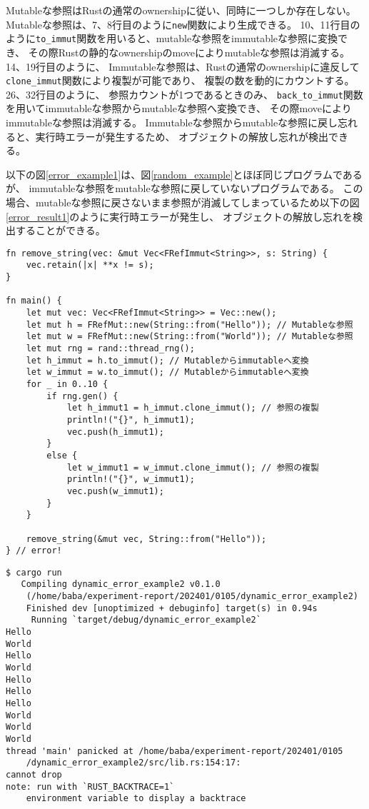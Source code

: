 \documentclass{sumiilab-paper}
\theoremstyle{mystyle}
\numberwithin{definition}{chapter} %
\begin{document}
Mutableな参照はRustの通常のownershipに従い、同時に一つしか存在しない。
Mutableな参照は、7、8行目のように\texttt{new}関数により生成できる。
10、11行目のように\texttt{to\_immut}関数を用いると、mutableな参照をimmutableな参照に変換でき、
その際Rustの静的なownershipのmoveによりmutableな参照は消滅する。
14、19行目のように、
Immutableな参照は、Rustの通常のownershipに違反して\texttt{clone\_immut}関数により複製が可能であり、
複製の数を動的にカウントする。
26、32行目のように、
参照カウントが1つであるときのみ、
\texttt{back\_to\_immut}関数を用いてimmutableな参照からmutableな参照へ変換でき、
その際moveによりimmutableな参照は消滅する。
Immutableな参照からmutableな参照に戻し忘れると、実行時エラーが発生するため、
オブジェクトの解放し忘れが検出できる。

以下の図\ref{error_example1}は、図\ref{random_example}とほぼ同じプログラムであるが、
immutableな参照をmutableな参照に戻していないプログラムである。
この場合、mutableな参照に戻さないまま参照が消滅してしまっているため以下の図\ref{error_result1}のように実行時エラーが発生し、
オブジェクトの解放し忘れを検出することができる。
\begin{lstlisting}[caption=オブジェクトの解放し忘れを検出する例, 
  label=error_example1, captionpos=b]
fn remove_string(vec: &mut Vec<FRefImmut<String>>, s: String) {
    vec.retain(|x| **x != s);
}

fn main() {
    let mut vec: Vec<FRefImmut<String>> = Vec::new();
    let mut h = FRefMut::new(String::from("Hello")); // Mutableな参照
    let mut w = FRefMut::new(String::from("World")); // Mutableな参照
    let mut rng = rand::thread_rng();
    let h_immut = h.to_immut(); // Mutableからimmutableへ変換
    let w_immut = w.to_immut(); // Mutableからimmutableへ変換
    for _ in 0..10 {
        if rng.gen() {
            let h_immut1 = h_immut.clone_immut(); // 参照の複製
            println!("{}", h_immut1);
            vec.push(h_immut1);
        }
        else {
            let w_immut1 = w_immut.clone_immut(); // 参照の複製
            println!("{}", w_immut1);
            vec.push(w_immut1);
        }
    }

    remove_string(&mut vec, String::from("Hello"));
} // error!
\end{lstlisting}
\begin{lstlisting}[caption=オブジェクトの解放し忘れのエラー, 
  label=error_result1, captionpos=b]
$ cargo run
   Compiling dynamic_error_example2 v0.1.0 
    (/home/baba/experiment-report/202401/0105/dynamic_error_example2)
    Finished dev [unoptimized + debuginfo] target(s) in 0.94s
     Running `target/debug/dynamic_error_example2`
Hello
World
Hello
World
Hello
Hello
Hello
World
World
World
thread 'main' panicked at /home/baba/experiment-report/202401/0105
    /dynamic_error_example2/src/lib.rs:154:17:
cannot drop
note: run with `RUST_BACKTRACE=1` 
    environment variable to display a backtrace
\end{lstlisting}
\end{document}
